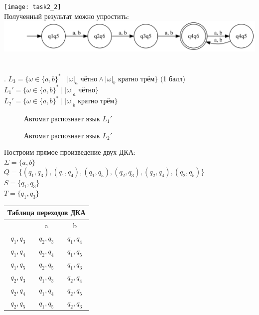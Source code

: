 \documentclass{article}
\begin{document}
\texttt{[image: task2\_2]}\\
\hfill \break
\normalsize{Полученный результат можно упростить:}\\
\hfill \break
\includegraphics [scale=0.8]{task2_2_simple}\\\\\\
\hfill \break
\hfill \break
\hfill \break
\hfill \break
\hfill {}. \(L_3 = \{\omega  \in \{a,b\}^* \mid |\omega|_a \text{ чётно} \land |\omega|_b \text{ кратно трём} \}\) (1 балл)\\
\hfill \break
\(L_1' = \{\omega  \in \{a,b\}^* \mid |\omega|_a \text{ чётно}\}\)\\
\(L_2' = \{\omega  \in \{a,b\}^* \mid |\omega|_b \text{ кратно трём}\}\)\\
\begin{figure}[h]
\caption{Автомат распознает язык \(L_1'\)}
\end{figure}
\begin{figure}[h]
\caption{Автомат распознает язык \(L_2'\)}
\end{figure}
\hfill \break
\normalsize{Построим прямое произведение двух ДКА:}\\
\(\Sigma = \{a,b\}\)\\
\(Q = \{(q_1,q_3), (q_1,q_4),(q_1,q_5),(q_2,q_3),(q_2,q_4),(q_2,q_5)\}\)\\
\(S = \{q_1,q_3\}\)\\
\(T = \{q_1,q_3\}\)\\
\begin{center}
\begin{tabular} {|c |c |c|}
\hline
\multicolumn{3}{|c|}{Таблица переходов ДКА} \\
\hline
 & a & b \\
\hline
\(q_1,q_3\) & \(q_2,q_3\) & \(q_1,q_4\) \\
\hline
\(q_1,q_4\) & \(q_2,q_4\) & \(q_1,q_5\) \\
\hline
\(q_1,q_5\) & \(q_2,q_5\) & \(q_1,q_3\) \\
\hline
\(q_2,q_3\) & \(q_1,q_3\) & \(q_2,q_4\) \\
\hline
\(q_2,q_4\) & \(q_1,q_4\) & \(q_2,q_5\) \\
\hline
\(q_2,q_5\) & \(q_1,q_5\) & \(q_2,q_3\) \\
\hline
\end{tabular}
\end{center}
\end{document}
